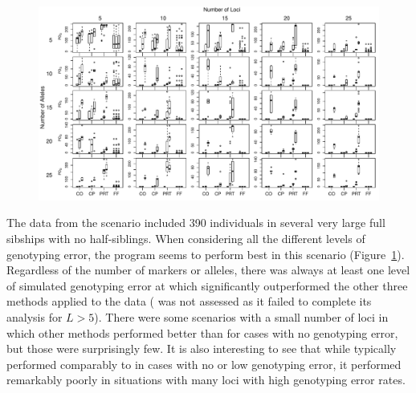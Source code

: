 \documentclass[11pt]{article}
\begin{document}
{\begin{figure}
\begin{center}
\includegraphics[width=\textwidth]{images/lotta_large_boxplots.pdf}  
\end{center}
\caption[Boxplot representation of values of $\PDS$ for on \lottalarge scenarios with $A$ and $L$ 
varying in rows and columns, respectively.  For each method (CO=\colony{}, CP=\colony-P, PRT=\prt, and 
FF=\familyfinder) three box plots are given.  The leftmost is for data with no genotyping error; the 
center with $d=0.02$,~$m=.01$, and the rightmost with $d=0.07$,~$m=.03$.  Note that for some values of 
$A$ and $L$, \prt{} failed to complete on any data sets, which is indicated by the absence of the 
boxplot in those cases. ]{}
\label{fig:llboxp}
\end{figure}
%
The data from the \lottalarge{} scenario included 390 individuals in several very large full sibships 
with no half-siblings.  When considering all the different levels of genotyping error, the program 
\familyfinder{} seems to perform best in this scenario (Figure~\ref{fig:llboxp}). Regardless of the 
number of markers or alleles, there was always at least one level of simulated genotyping error at 
which \familyfinder{} significantly outperformed the other three methods applied to the \lottalarge{} 
data (\kinalyzer{} was not assessed as it failed to complete its analysis for $L>5$). There were some 
scenarios with a small number of loci in which other methods performed better than \familyfinder{} for 
cases with no genotyping error, but those were surprisingly few.  It is also interesting to see that 
while \colony{} typically performed comparably to \familyfinder{} in cases with no or low genotyping 
error, it performed remarkably poorly in situations with many loci with high genotyping error rates.  

}
\end{document}
